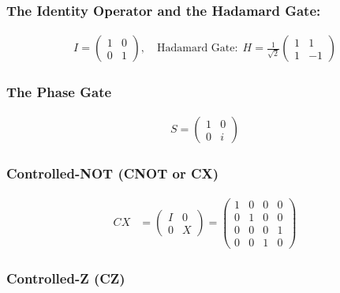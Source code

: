 \documentclass[11pt]{article}
\begin{document}
    \hypertarget{the-identity-operator-and-the-hadamard-gate}{%
\subsubsection{The Identity Operator and the Hadamard
Gate:}\label{the-identity-operator-and-the-hadamard-gate}}

\begin{align}
I = \begin{pmatrix} 1&0 \\ 0&1 \end{pmatrix}, \quad
\text{Hadamard Gate:} \ \ H = \frac{1}{\sqrt{2}} \begin{pmatrix} 1&1 \\ 1&-1 \end{pmatrix}
\end{align}

    \hypertarget{the-phase-gate}{%
\subsubsection{The Phase Gate}\label{the-phase-gate}}

\begin{align}
S = 
\begin{pmatrix}
1 & 0 \\
0 & i
\end{pmatrix}
\end{align}

    \hypertarget{controlled-not-cnot-or-cx}{%
\subsubsection{Controlled-NOT (CNOT or
CX)}\label{controlled-not-cnot-or-cx}}

\begin{align}
CX &= \begin{pmatrix} I & 0 \\ 0 & X \end{pmatrix} = 
\begin{pmatrix} 
1 & 0 & 0 & 0 \\
0 & 1 & 0 & 0 \\
0 & 0 & 0 & 1 \\
0 & 0 & 1 & 0
\end{pmatrix}
\end{align}

    \hypertarget{controlled-z-cz}{%
\subsubsection{Controlled-Z (CZ)}\label{controlled-z-cz}}
\end{document}
